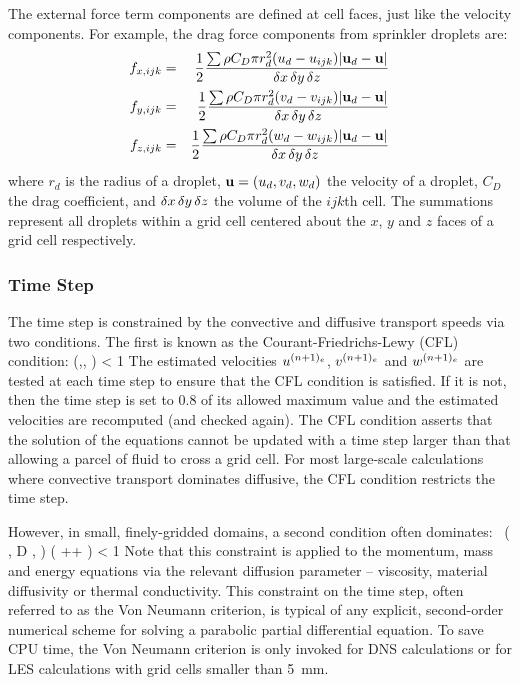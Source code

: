 \documentclass[11pt]{book}
\begin{document}
The external force term components are defined at cell faces, just like the velocity components. For example, the drag force components
from sprinkler droplets are:
\begin{eqnarray}
f_{x,ijk} &=&\frac{1}{2}\frac{\sum \rho C_D\pi r_d^2 (u_d-u_{ijk}) |{\bf u}_d-{\bf u}|}{\delta x\, \delta y\, \delta z}  \\
f_{y,ijk} &=&\frac{1}{2}\frac{\sum \rho C_D\pi r_d^2 (v_d-v_{ijk}) |{\bf u}_d-{\bf u}|}{\delta x\, \delta y\, \delta z}  \\
f_{z,ijk} &=&\frac{1}{2}\frac{\sum \rho C_D\pi r_d^2 (w_d-w_{ijk}) |{\bf u}_d-{\bf u}|}{\delta x\, \delta y \,\delta z}
\end{eqnarray}
where $r_d$ is the radius of a droplet, ${\bf u}=(u_d,v_d,w_d)$ the velocity of a droplet, $C_D$ the drag
coefficient, and $\delta x \, \delta y \,\delta z$ the volume of the $ijk$th cell.
The summations represent all droplets within a grid cell centered about
the $x$, $y$ and $z$ faces of a grid cell respectively.


\subsubsection{Time Step}

\label{stability}

The time step is constrained by the convective and diffusive
transport speeds via two conditions. The first is known as the
Courant-Friedrichs-Lewy (CFL) condition:
\be \dt \; \max \left(,, \right) < 1  \label{cfl} \ee
The estimated velocities
$u^{(n+1)_e}$, $v^{(n+1)_e}$ and $w^{(n+1)_e}$ are tested at each
time step to ensure that the CFL condition is satisfied. If it is not,
then the time step is set to 0.8 of its allowed maximum value
and the estimated velocities are recomputed (and checked again).
The CFL condition asserts that the solution of the equations cannot be updated with a time step
larger than that allowing a parcel of fluid to cross a grid cell. For most large-scale calculations where
convective transport dominates diffusive, the CFL condition restricts the time step.

However, in small, finely-gridded domains, a second condition often dominates:
 \, \max \left( \nu , D ,  \right)  \; \dt  \left(
              ++ \right) < 1  \label{vn} \ee
Note that this constraint is applied to the momentum, mass and energy equations via the
relevant diffusion parameter -- viscosity, material diffusivity or thermal conductivity.
This constraint on the time step, often referred to as the Von Neumann criterion, is typical
of any explicit, second-order numerical scheme for solving a parabolic partial differential
equation. To save CPU time, the Von Neumann criterion is only invoked for DNS calculations or for LES
calculations with grid cells smaller than 5~mm.
\end{document}
